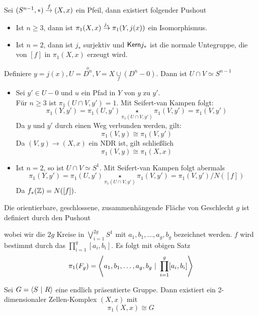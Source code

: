 Sei $(S^{n-1}, *) \overset{f}{\rightarrow} (X,x)$ ein Pfeil, dann existiert folgender Pushout
\begin{center}
\end{center}
\begin{itemize}
\item Ist $n \geq 3$, dann ist $\pi_1(X,x) \overset{j_*}{\rightarrow} \pi_1(Y,j(x))$ ein Isomorphismus.
\item Ist $n = 2$, dann ist $j_*$ surjektiv und $\textsf{Kern} j_*$ ist die normale Untegruppe, die von $[f]$ in $\pi_1(X,x)$ erzeugt wird.
\end{itemize}

\begin{Beweis}{}
Definiere $y = j(x), U = \overset{o}{D^n}, V = X \underset{f}{\cup}(D^n - 0)$. Dann ist $U\cap V \simeq S^{n-1}$
\begin{itemize}
\item Sei $y' \in U-0$ und $u$ ein Pfad in $Y$ von $y$ zu $y'$.\\
Für $n \geq 3$ ist $\pi_1(U\cap V, y') = 1$. Mit Seifert-van Kampen folgt:
\[\pi_1(Y,y') = \pi_1(U,y') \underset{\pi_1(U\cap V, y')}{\star} \pi_1(V, y') = \pi_1(V, y')\]
Da $y$ und $y'$ durch einen Weg verbunden werden, gilt:
\[\pi_1(V, y) \cong \pi_1(V, y')\]
Da $(V,y) \rightarrow (X,x)$ ein NDR ist, gilt schließlich
\[\pi_1(V, y) \cong \pi_1(X, x)\]

\item Ist $n = 2$, so ist $U\cap V \simeq S^1$. Mit Seifert-van Kampen folgt abermals
\[\pi_1(Y,y') = \pi_1(U,y') \underset{\pi_1(U\cap V, y')}{\star} \pi_1(V, y') = \pi_1(V, y') / N([f])\]
Da $f_*(\mathbb{Z}) = N([f])$.
\end{itemize}

\end{Beweis}

Die orientierbare, geschlossene, zusammenhängende Fläche von Geschlecht $g$ ist definiert durch den Pushout
\begin{center}
\end{center}
wobei wir die $2g$ Kreise in $\bigvee_{i=1}^{2g}S^1$ mit $a_1,b_1,\ldots,a_g, b_g$ bezeichnet werden. $f$ wird bestimmt durch das  $\prod_{i=1}^{g}[a_i,b_i]$. Es folgt mit obigen Satz
\[\pi_1(F_g) = \left\langle a_1,b_1,\ldots, a_g, b_g~|~\prod_{i=1}^{g}[a_i,b_i] \right\rangle\]


\Satz{}
Sei $G = \left\langle S~|~R \right\rangle$ eine endlich präsentierte Gruppe. Dann existiert ein 2-dimensionaler Zellen-Komplex $(X,x)$ mit
\[\pi_1(X,x) \cong G\]


